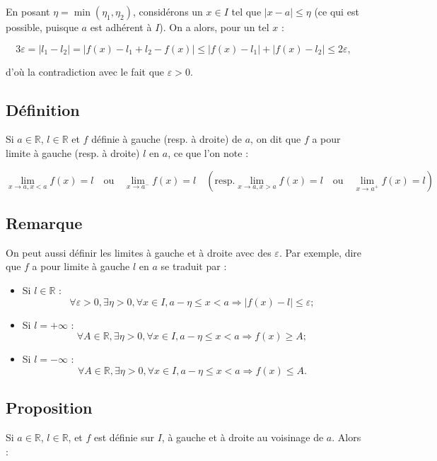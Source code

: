 \documentclass{article}
\begin{document}
	En posant $\eta = \min(\eta_1, \eta_2)$, considérons un $x \in I$ tel que $|x - a| \leq \eta$ (ce qui est possible, puisque $a$ est adhérent à $I$). On a alors, pour un tel $x$ :
	
	\[
	3\varepsilon = |l_1 - l_2| = |f(x) - l_1 + l_2 - f(x)| \leq |f(x) - l_1| + |f(x) - l_2| \leq 2\varepsilon,
	\]
	
	d'où la contradiction avec le fait que $\varepsilon > 0$.
	\subsection{Définition }
	
	Si $a \in \mathbb{R}$, $l \in \mathbb{R}$ et $f$ définie à gauche (resp. à droite) de $a$, on dit que $f$ a pour limite à gauche (resp. à droite) $l$ en $a$, ce que l’on note :
	
	\[
	\lim_{x \to a, x < a} f(x) = l \quad \text{ou} \quad \lim_{x \to a^-} f(x) = l \quad (\text{resp.} \lim_{x \to a, x > a} f(x) = l \quad \text{ou} \quad \lim_{x \to a^+} f(x) = l)
	\]
	

	
	\subsection{Remarque}
	
	On peut aussi définir les limites à gauche et à droite avec des $\varepsilon$. Par exemple, dire que $f$ a pour limite à gauche $l$ en $a$ se traduit par :
	
	\begin{itemize}
		\item Si $l \in \mathbb{R}$ : 
		\[
		\forall \varepsilon > 0, \exists \eta > 0, \forall x \in I, a - \eta \leq x < a \Rightarrow |f(x) - l| \leq \varepsilon;
		\]
		\item Si $l = +\infty$ :
		\[
		\forall A \in \mathbb{R}, \exists \eta > 0, \forall x \in I, a - \eta \leq x < a \Rightarrow f(x) \geq A;
		\]
		\item Si $l = -\infty$ :
		\[
		\forall A \in \mathbb{R}, \exists \eta > 0, \forall x \in I, a - \eta \leq x < a \Rightarrow f(x) \leq A.
		\]
	\end{itemize}
	\subsection{Proposition}
	
	Si $a \in \mathbb{R}$, $l \in \mathbb{R}$, et $f$ est définie sur $I$, à gauche et à droite au voisinage de $a$. Alors :
	
\end{document}
